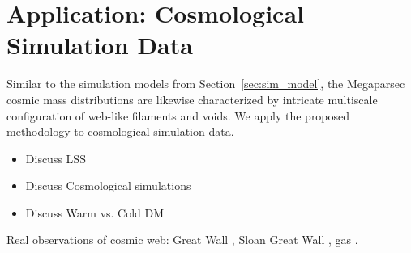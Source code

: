 \documentclass[12pt]{article}
\begin{document}

\section{Application: Cosmological Simulation Data}
\label{sec:application}

Similar to the simulation models from Section~\ref{sec:sim_model}, the Megaparsec cosmic mass distributions are likewise characterized by intricate multiscale configuration of web-like filaments and voids. We apply the proposed methodology to cosmological simulation data.

{\color{red}
\begin{itemize}
\item  Discuss LSS
\item  Discuss Cosmological simulations
\item  Discuss Warm vs. Cold DM
\end{itemize}
Real observations of cosmic web:  Great Wall \cite{geller1989mapping}, Sloan Great Wall \cite{gott2005map}, gas \cite{cantalupo2014cosmic}.}
\end{document}
